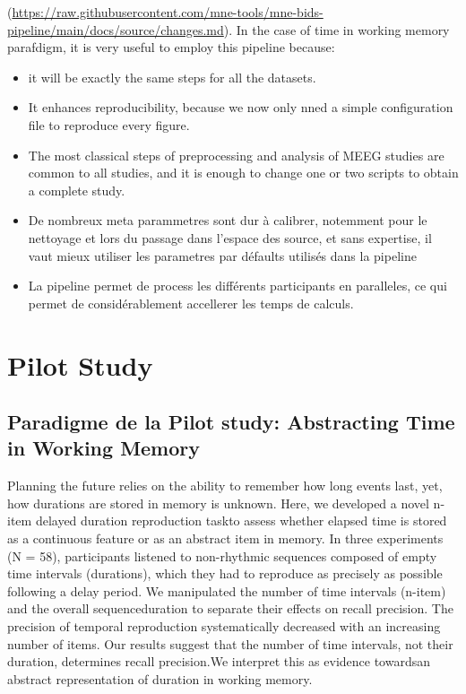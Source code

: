(\url{https://raw.githubusercontent.com/mne-tools/mne-bids-pipeline/main/docs/source/changes.md}).
In the case of time in working memory parafdigm, it is very useful to employ this pipeline because:
\begin{itemize}
    \item it will be exactly the same steps for all the datasets.
    \item It enhances reproducibility, because we now only nned a simple configuration file to reproduce every figure.
    \item The most classical steps of preprocessing and analysis of MEEG studies are common to all studies, and it is enough to change one or two scripts to obtain a complete study.
    \item De nombreux meta parammetres sont dur à calibrer, notemment pour le nettoyage et lors du passage dans l'espace des source, et sans expertise, il vaut mieux utiliser les parametres par défaults utilisés dans la pipeline
    \item La pipeline permet de process les différents participants en paralleles, ce qui permet de considérablement accellerer les temps de calculs.
\end{itemize}

\section{Pilot Study}
\subsection{Paradigme de la Pilot study: Abstracting Time in Working Memory}

Planning the future relies on the ability to remember how long events last, yet, how durations  are  stored  in  memory  is  unknown.  Here,  we  developed  a  novel n-item delayed duration reproduction taskto assess whether elapsed time is stored as a continuous feature or as an abstract item in memory. In three experiments (N = 58), participants listened to non-rhythmic sequences composed of empty time intervals (durations), which they had to reproduce as precisely as possible following a delay period.  We  manipulated  the  number  of  time  intervals  (n-item)  and  the  overall sequenceduration  to separate  their effects  on  recall  precision.  The  precision  of temporal reproduction systematically decreased with an increasing number of items. Our results suggest that the number of time intervals, not their duration, determines recall precision.We interpret this as evidence towardsan abstract representation of duration in working memory.


